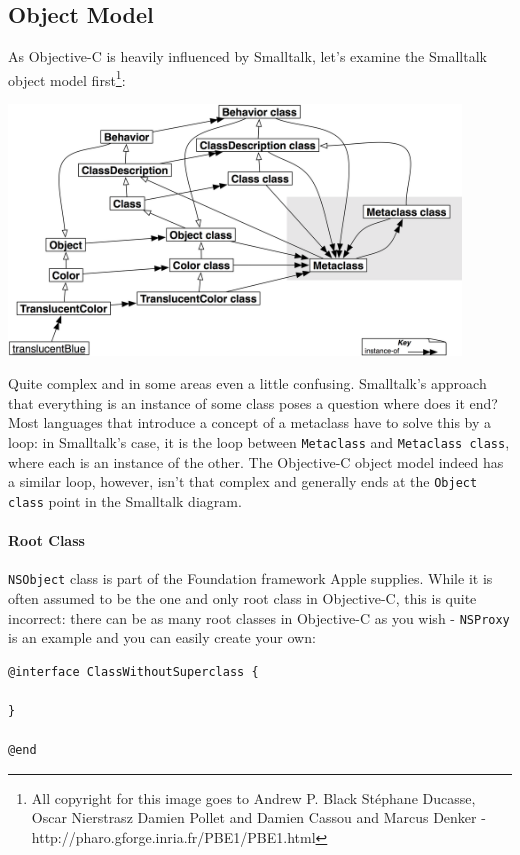 \subsection{Object Model}

As Objective-C is heavily influenced by Smalltalk, let's examine the Smalltalk object model first\footnote{All copyright for this image goes to Andrew P. Black St\'{e}phane Ducasse, Oscar Nierstrasz Damien Pollet and Damien Cassou and Marcus Denker - http://pharo.gforge.inria.fr/PBE1/PBE1.html}:

\vspace{20pt}
\includegraphics[width=120mm]{./img/smalltalk_class_hierarchy.png}
\vspace{20pt}

Quite complex and in some areas even a little confusing. Smalltalk's approach that everything is an instance of some class poses a question where does it end? Most languages that introduce a concept of a metaclass have to solve this by a loop: in Smalltalk's case, it is the loop between \verb=Metaclass= and \verb=Metaclass class=, where each is an instance of the other. The Objective-C object model indeed has a similar loop, however, isn't that complex and generally ends at the \verb=Object class= point in the Smalltalk diagram.

\paragraph{Root Class}
\verb=NSObject= class is part of the Foundation framework Apple supplies. While it is often assumed to be the one and only root class in Objective-C, this is quite incorrect: there can be as many root classes in Objective-C as you wish - \verb=NSProxy= is an example and you can easily create your own:

\begin{verbatim}@interface ClassWithoutSuperclass {
  
}

@end\end{verbatim}

